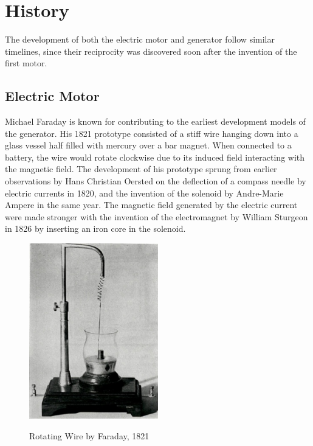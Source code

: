 \section{History}
The development of both the electric motor and generator follow similar timelines, since their reciprocity was discovered soon after the invention of the first motor.

    \subsection{Electric Motor}
    Michael Faraday is known for contributing to the earliest development models of the generator. His 1821 prototype consisted of a stiff wire hanging down into a glass vessel half filled with mercury over a bar magnet. When connected to a battery, the wire would rotate clockwise due to its induced field interacting with the magnetic field. \cite{firstmotor} The development of his prototype sprung from earlier observations by Hans Christian Oersted on the deflection of a compass needle by electric currents in 1820, and the invention of the solenoid by Andre-Marie Ampere in the same year. \cite{needcite} The magnetic field generated by the electric current were made stronger with the invention of the electromagnet by William Sturgeon in 1826 by inserting an iron core in the solenoid. \cite{needcite} \\

    \begin{figure}[ht]
        \begin{center}
            \includegraphics[width=0.5\textwidth]{figures/history/rotating_wire.jpg}
            \label{fig:faraday}
        \end{center} \caption{Rotating Wire by Faraday, 1821}
    \end{figure}

